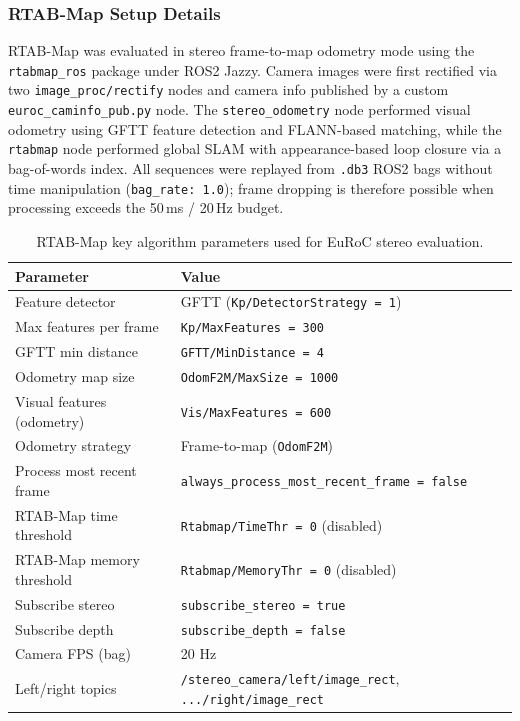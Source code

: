 \documentclass[11pt]{article}
\begin{document}
\subsubsection{RTAB-Map Setup Details}

RTAB-Map was evaluated in stereo frame-to-map odometry mode using the \texttt{rtabmap\_ros} package under ROS2 Jazzy. Camera images were first rectified via two \texttt{image\_proc/rectify} nodes and camera info published by a custom \texttt{euroc\_caminfo\_pub.py} node. The \texttt{stereo\_odometry} node performed visual odometry using GFTT feature detection and FLANN-based matching, while the \texttt{rtabmap} node performed global SLAM with appearance-based loop closure via a bag-of-words index. All sequences were replayed from \texttt{.db3} ROS2 bags without time manipulation (\texttt{bag\_rate: 1.0}); frame dropping is therefore possible when processing exceeds the 50\,ms / 20\,Hz budget.

\begin{table}[H]
\centering
\small
\caption{RTAB-Map key algorithm parameters used for EuRoC stereo evaluation.}
\label{tab:rtabmap_algorithm_params}
\begin{tabular}{ll}
\toprule
Parameter & Value \\
\midrule
Feature detector & GFTT (\texttt{Kp/DetectorStrategy = 1}) \\
Max features per frame & \texttt{Kp/MaxFeatures = 300} \\
GFTT min distance & \texttt{GFTT/MinDistance = 4} \\
Odometry map size & \texttt{OdomF2M/MaxSize = 1000} \\
Visual features (odometry) & \texttt{Vis/MaxFeatures = 600} \\
Odometry strategy & Frame-to-map (\texttt{OdomF2M}) \\
Process most recent frame & \texttt{always\_process\_most\_recent\_frame = false} \\
RTAB-Map time threshold & \texttt{Rtabmap/TimeThr = 0} (disabled) \\
RTAB-Map memory threshold & \texttt{Rtabmap/MemoryThr = 0} (disabled) \\
Subscribe stereo & \texttt{subscribe\_stereo = true} \\
Subscribe depth & \texttt{subscribe\_depth = false} \\
Camera FPS (bag) & 20 Hz \\
Left/right topics & \texttt{/stereo\_camera/left/image\_rect}, \texttt{.../right/image\_rect} \\
\bottomrule
\end{tabular}
\end{table}
\end{document}
